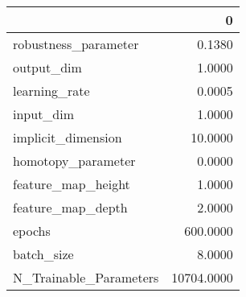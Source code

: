 \begin{tabular}{lr}
\toprule
{} &           0 \\
\midrule
robustness\_parameter   &      0.1380 \\
output\_dim             &      1.0000 \\
learning\_rate          &      0.0005 \\
input\_dim              &      1.0000 \\
implicit\_dimension     &     10.0000 \\
homotopy\_parameter     &      0.0000 \\
feature\_map\_height     &      1.0000 \\
feature\_map\_depth      &      2.0000 \\
epochs                 &    600.0000 \\
batch\_size             &      8.0000 \\
N\_Trainable\_Parameters &  10704.0000 \\
\bottomrule
\end{tabular}
